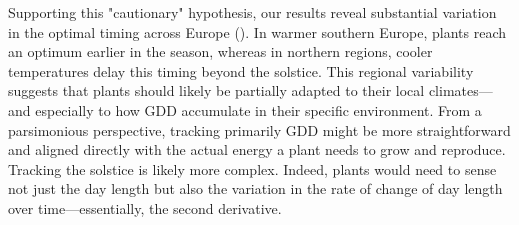 \documentclass[11pt,letter]{article}
\begin{document}
Supporting this "cautionary" hypothesis, our results reveal substantial variation in the optimal timing across Europe (). In warmer southern Europe, plants reach an optimum earlier in the season, whereas in northern regions, cooler temperatures delay this timing beyond the solstice. 
This regional variability suggests that plants should likely be partially adapted to their local climates---and especially to how GDD accumulate in their specific environment.
From a parsimonious perspective, tracking primarily GDD might be more straightforward and aligned directly with the actual energy a plant needs to grow and reproduce. %
Tracking the solstice is likely more complex. Indeed, plants would need to sense not just the day length but also the variation in the rate of change of day length over time---essentially, the second derivative.

\end{document}
